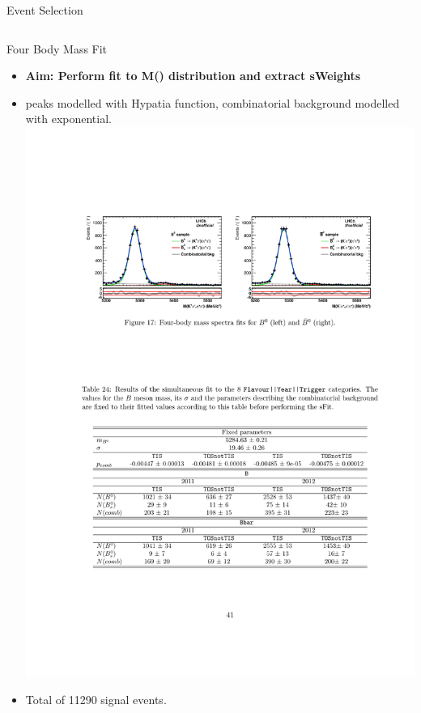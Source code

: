 \documentclass{beamer}
\begin{document}
\begin{frame}{Event Selection}
\begin{itemize}
\begin{columns}
\begin{column}{0.39\textwidth}
      \end{column}
    \end{columns}
  \end{itemize}
\end{frame}

\begin{frame}{Four Body Mass Fit}
  \begin{itemize}
  \item \textbf{Aim: Perform fit to M(\pion\pion\kaon\pion) distribution and extract sWeights}
  \item {} peaks modelled with Hypatia function, combinatorial background modelled with exponential.
    \includegraphics[width=.9\textwidth]{KstarRho4Bod.pdf}
  \item Total of 11290 \decay{\Bd}{(\pip\pim)(\Kp\pim)} signal events.
  \end{itemize}
\end{frame}
\end{document}
